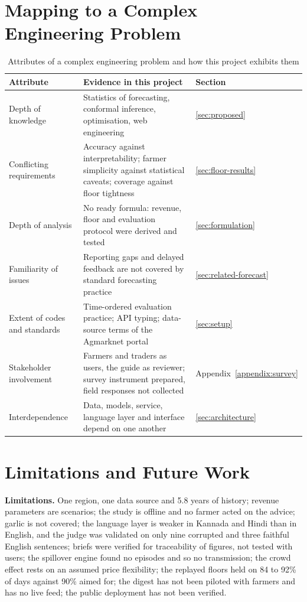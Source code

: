 \section{Mapping to a Complex Engineering Problem}
\label{sec:cep}

\begin{table}[!t]
\centering
\caption{Attributes of a complex engineering problem and how this project exhibits them}
\label{tab:cep}
\small
\begin{tabular}{|p{3.6cm}|p{8.2cm}|l|}
\hline
\textbf{Attribute} & \textbf{Evidence in this project} & \textbf{Section} \\ \hline
Depth of knowledge & Statistics of forecasting, conformal inference, optimisation, web engineering & \ref{sec:proposed} \\ \hline
Conflicting requirements & Accuracy against interpretability; farmer simplicity against statistical caveats; coverage against floor tightness & \ref{sec:floor-results} \\ \hline
Depth of analysis & No ready formula: revenue, floor and evaluation protocol were derived and tested & \ref{sec:formulation} \\ \hline
Familiarity of issues & Reporting gaps and delayed feedback are not covered by standard forecasting practice & \ref{sec:related-forecast} \\ \hline
Extent of codes and standards & Time-ordered evaluation practice; API typing; data-source terms of the Agmarknet portal & \ref{sec:setup} \\ \hline
Stakeholder involvement & Farmers and traders as users, the guide as reviewer; survey instrument prepared, field responses not collected & Appendix~\ref{appendix:survey} \\ \hline
Interdependence & Data, models, service, language layer and interface depend on one another & \ref{sec:architecture} \\ \hline
\end{tabular}
\end{table}

\section{Limitations and Future Work}
\label{sec:future-work}

\noindent\textbf{Limitations.} One region, one data source and 5.8 years of history; revenue parameters are scenarios; the study is offline and no farmer acted on the advice; garlic is not covered; the language layer is weaker in Kannada and Hindi than in English, and the judge was validated on only nine corrupted and three faithful English sentences; briefs were verified for traceability of figures, not tested with users; the spillover engine found no episodes and so no transmission; the crowd effect rests on an assumed price flexibility; the replayed floors held on 84 to 92\% of days against 90\% aimed for; the digest has not been piloted with farmers and has no live feed; the public deployment has not been verified.

